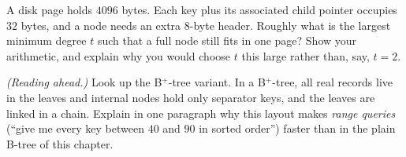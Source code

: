 \begin{exercise}\label{ch18:ex-choose-t}
A disk page holds $4096$ bytes. Each key plus its associated child pointer occupies
$32$ bytes, and a node needs an extra $8$-byte header. Roughly what is the largest
minimum degree $t$ such that a full node still fits in one page? Show your
arithmetic, and explain why you would choose $t$ this large rather than, say,
$t = 2$.
\end{exercise}

\begin{exercise}\label{ch18:ex-bplus}
\emph{(Reading ahead.)} Look up the B$^+$-tree variant. In a B$^+$-tree, all real
records live in the leaves and internal nodes hold only separator keys, and the
leaves are linked in a chain. Explain in one paragraph why this layout makes
\emph{range queries} (``give me every key between $40$ and $90$ in sorted order'')
faster than in the plain B-tree of this chapter.
\end{exercise}
